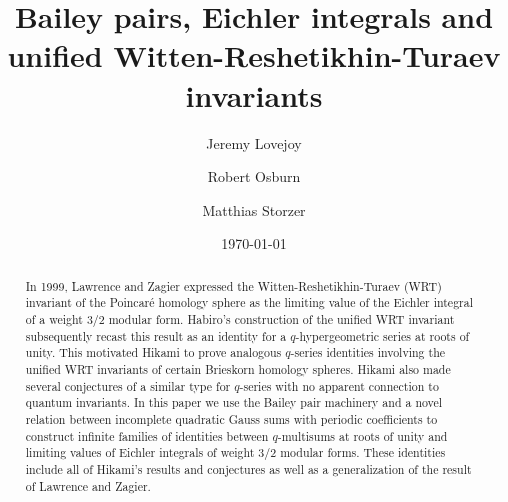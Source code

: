 \documentclass[11pt,reqno]{amsart}
\theoremstyle{definition}
\numberwithin{equation}{section}
\renewcommand{\=}{\;=\;}
\begin{document}
\title{Bailey pairs, Eichler integrals and unified Witten-Reshetikhin-Turaev invariants}

\author{Jeremy Lovejoy}
\author{Robert Osburn}
\author{Matthias Storzer}

\address{CNRS, Universit{\'e} Paris Cit{\'e}, B{\^a}timent Sophie Germain, Case Courier 7014, 8 Place Aur{\'e}lie Nemours, 75205 Paris Cedex 13, France}


\address{School of Mathematical Sciences, University College Cork, Cork, Ireland}



\date{\today}

\begin{abstract}
In 1999, Lawrence and Zagier expressed the Witten-Reshetikhin-Turaev (WRT) invariant of the Poincar{\'e} homology sphere as the limiting value of the Eichler integral of a weight 3/2 modular form.  Habiro's construction of the unified WRT invariant subsequently recast this result as an identity for a $q$-hypergeometric series at roots of unity.  This motivated Hikami to prove analogous $q$-series identities involving the unified WRT invariants of certain Brieskorn homology spheres.  Hikami also made several conjectures of a similar type for $q$-series with no apparent connection to quantum invariants.  In this paper we use the Bailey pair machinery and a novel relation between incomplete quadratic Gauss sums with periodic coefficients to construct infinite families of identities between $q$-multisums at roots of unity and limiting values of Eichler integrals of weight 3/2 modular forms.  These identities include all of Hikami's results and conjectures as well as a generalization of the result of Lawrence and Zagier. 
\end{abstract}

\maketitle
\end{document}
